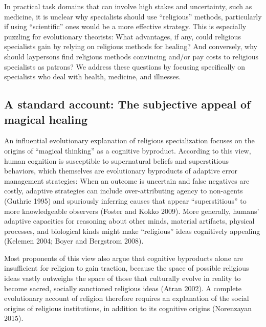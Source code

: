 \documentclass[
  11pt,
]{article}
\begin{document}
In practical task domains that can involve high stakes and uncertainty, such as medicine, it is unclear why specialists should use ``religious'' methods, particularly if using ``scientific'' ones would be a more effective strategy. This is especially puzzling for evolutionary theorists: What advantages, if any, could religious specialists gain by relying on religious methods for healing? And conversely, why should laypersons find religious methods convincing and/or pay costs to religious specialists as patrons? We address these questions by focusing specifically on specialists who deal with health, medicine, and illnesses.

\hypertarget{a-standard-account-the-subjective-appeal-of-magical-healing}{%
\subsection{A standard account: The subjective appeal of magical healing}\label{a-standard-account-the-subjective-appeal-of-magical-healing}}

An influential evolutionary explanation of religious specialization focuses on the origins of ``magical thinking'' as a cognitive byproduct. According to this view, human cognition is susceptible to supernatural beliefs and superstitious behaviors, which themselves are evolutionary byproducts of adaptive error management strategies: When an outcome is uncertain and false negatives are costly, adaptive strategies can include over-attributing agency to non-agents (Guthrie 1995) and spuriously inferring causes that appear ``superstitious'' to more knowledgeable observers (Foster and Kokko 2009). More generally, humans' adaptive capacities for reasoning about other minds, material artifacts, physical processes, and biological kinds might make ``religious'' ideas cognitively appealing (Kelemen 2004; Boyer and Bergstrom 2008).

Most proponents of this view also argue that cognitive byproducts alone are insufficient for religion to gain traction, because the space of possible religious ideas vastly outweighs the space of those that culturally evolve in reality to become sacred, socially sanctioned religious ideas (Atran 2002). A complete evolutionary account of religion therefore requires an explanation of the social origins of religious institutions, in addition to its cognitive origins (Norenzayan 2015).
\end{document}
